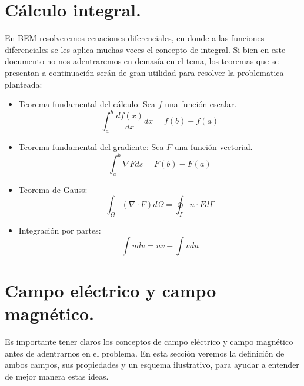\documentclass[11pt]{article}
\begin{document}
\section{Cálculo integral.}\label{sec:Calculo integral.}
\setcounter{figure}{0}
\setcounter{equation}{0}
En BEM resolveremos ecuaciones diferenciales, en donde a las funciones diferenciales se les aplica muchas veces el concepto de integral. Si bien en este documento no nos adentraremos en demasía en el tema, los teoremas que se presentan a continuación serán de gran utilidad para resolver la problematica planteada:
\begin{itemize}
\item Teorema fundamental del cálculo: Sea $f$ una función escalar.
\begin{equation}
\label{eq:Teorema fundamental del calculo}
\int^b_a \frac{df(x)}{dx}dx=f(b)-f(a)
\end{equation}
\item Teorema fundamental del gradiente: Sea $F$ una función vectorial.
\begin{equation}
\label{eq:Teorema fundamental del gradiente}
\int^b_a \nabla F ds=F(b)-F(a)
\end{equation}
\item Teorema de Gauss:
\begin{equation}
\label{eq:Teorema de Gauss}
\int_\Omega(\nabla\cdot F)d\Omega=\oint_\Gamma n\cdot F d\Gamma
\end{equation}
\item Integración por partes:
\begin{equation}
\label{eq:Integracion por partes}
\int u dv=uv-\int v du
\end{equation}
\end{itemize}

\section{Campo eléctrico y campo magnético.}\label{sec:Campo electrico y campo magnetico.}
\setcounter{equation}{0}
\setcounter{figure}{0}
Es importante tener claros los conceptos de campo eléctrico y campo magnético antes de adentrarnos en el problema. En esta sección veremos la definición de ambos campos, sus propiedades y un esquema ilustrativo, para ayudar a entender de mejor manera estas ideas.
\end{document}
